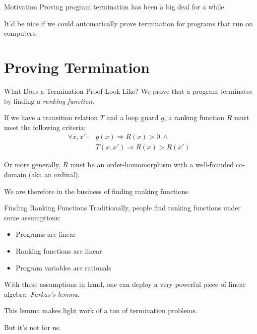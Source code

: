 \documentclass[xcolor=pdftex,t,11pt]{beamer}
\begin{document}
\begin{frame}{Motivation}
Proving program termination has been a big deal for a while.

It'd be nice if we could automatically prove termination for programs that run on computers.
\end{frame}

\section{Proving Termination}
\begin{frame}{What Does a Termination Proof Look Like?}
We prove that a program terminates by finding a \emph{ranking function}.

\vspace{1em}

If we have a transition relation $T$ and a loop guard $g$, a ranking function $R$
must meet the following criteria:
\begin{align}
 \forall x, x' \cdot & g(x) \Rightarrow R(x) > 0 ~ \wedge \\
                     & T(x, x') \Rightarrow R(x) > R(x')
\end{align}

Or more generally, $R$ must be an order-homomorphism with a well-founded co-domain (aka an ordinal).

\vspace{1em}

We are therefore in the business of finding ranking functions.
\end{frame}

\begin{frame}{Finding Ranking Functions}
Traditionally, people find ranking functions under some assumptions:

\begin{itemize}
 \item Programs are linear
 \item Ranking functions are linear
 \item Program variables are rationals
\end{itemize}

\vspace{1em}

With these assumptions in hand, one can deploy a very powerful piece of linear algebra: \emph{Farkas's lemma}.

This lemma makes light work of a ton of termination problems.

\vspace{1em}

But it's not for us.
\end{frame}
\end{document}
